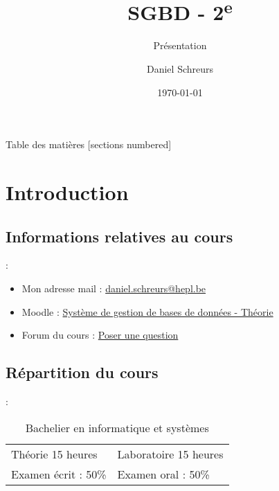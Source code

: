 \documentclass[10pt]{beamer}
\title{SGBD - 2\textsuperscript{e}}
\subtitle{Présentation}
\date{\today}
\author{Daniel Schreurs}
\institute{Haute École de la Province de Liège}
\begin{document}
\maketitle

\begin{frame}[allowframebreaks]{Table des matières}
    [sections numbered]
    \tableofcontents
\end{frame}

\section{Introduction}

\subsection{Informations relatives au cours}
\begin{frame}{\secname : \subsecname}
    \begin{itemize}
        \item Mon adresse mail : \href{mailto:daniel.schreurs@hepl.be}{daniel.schreurs@hepl.be}
        \item Moodle : \href{https://moodle.ecolevirtuelle.be/course/view.php?id=25655}{Système de gestion de bases de données - Théorie}
        \item Forum du cours : \href{https://moodle.ecolevirtuelle.be/mod/forum/view.php?id=183803}{Poser une question}
    \end{itemize}
\end{frame}

\subsection{Répartition du cours}
\begin{frame}{\secname : \subsecname}
    \begin{table}[]
        \begin{tabular}{ll}
            Théorie 15 heures   & Laboratoire 15 heures \\
            Examen écrit : 50\% & Examen oral : 50\%
        \end{tabular}
        \caption*{Bachelier en informatique et systèmes}
    \end{table}
\end{frame}
\end{document}
